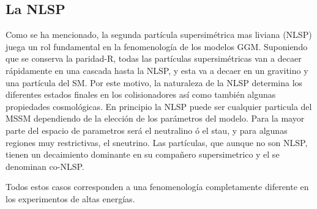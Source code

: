 \subsection{La NLSP}

Como se ha mencionado, la segunda partícula supersimétrica mas liviana (NLSP) juega un rol fundamental
en la fenomenología de los modelos GGM. Suponiendo que se conserva la paridad-R,
todas las partículas supersimétricas van a decaer rápidamente en una cascada
hasta la NLSP, y esta va a decaer en un gravitino y una partícula del SM. Por este motivo, la
naturaleza de la NLSP determina los diferentes estados finales en los
colisionadores así como también algunas propiedades cosmológicas. En principio
la NLSP puede ser cualquier particula del MSSM dependiendo de la elección de los
parámetros del modelo. Para la mayor parte del espacio de parametros será el neutralino ó
el stau, y para algunas regiones muy restrictivas, el
sneutrino\cite{arxiv:9801271}.
Las partículas, que aunque no son NLSP, tienen un decaimiento dominante en su
compañero supersimetrico y el {\gravino} se denominan co-NLSP.






Todos estos casos corresponden a una fenomenología completamente diferente en
los experimentos de altas energías.


